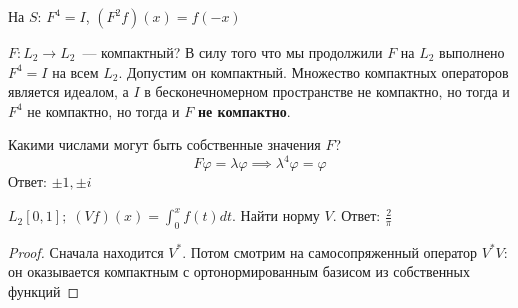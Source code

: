 \begin{unnecessary}
\begin{note}
    На $S$: $F^4=I$, \; $(F^2 f)(x)=f(-x)$
\end{note}
\begin{example}
    $F: L_2 \to L_2$~--- компактный? \newline В силу того что мы продолжили $F$ на $L_2$ выполнено $F^4=I$ на всем $L_2$. Допустим он компактный. Множество компактных операторов является идеалом, а $I$ в бесконечномерном пространстве не компактно, но тогда и $F^4$ не компактно, но тогда и $F$ \textbf{не компактно}.
\end{example}
\begin{example}
    Какими числами могут быть собственные значения $F$?
    \[ F \varphi = \lambda \varphi \implies \lambda^4 \varphi = \varphi \]
    Ответ: $\pm 1, \pm i$
\end{example}

\begin{example}
    $L_2[0,1]; \; (Vf)(x) = \int_0^x f(t) dt$. Найти норму $V$.
    Ответ: $\frac{2}{\pi}$
\end{example}

\begin{proof}
    Сначала находится $V^*$. Потом смотрим на самосопряженный оператор $V^* V$: он оказывается компактным с ортонормированным базисом из собственных функций
\end{proof}
\end{unnecessary}